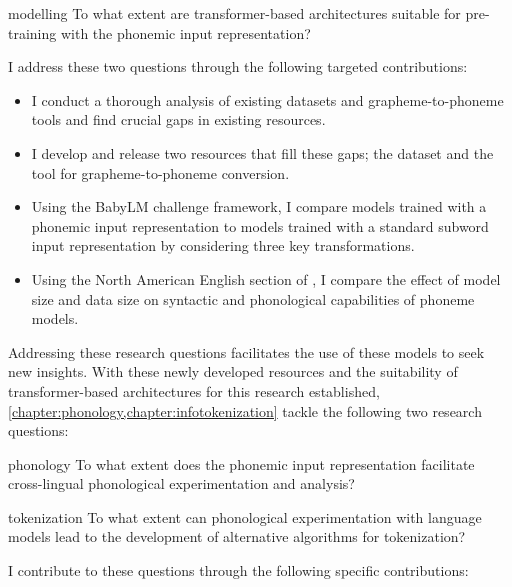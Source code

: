 \begin{question}{}{modelling}
    To what extent are transformer-based architectures suitable for pre-training with the phonemic input representation?
\end{question}

I address these two questions through the following targeted contributions:

\begin{itemize}
    \item I conduct a thorough analysis of existing datasets and grapheme-to-phoneme tools and find crucial gaps in existing resources.
    \item I develop and release two resources that fill these gaps; the \ipachildes dataset and the \gpp tool for grapheme-to-phoneme conversion.
    \item Using the BabyLM challenge framework, I compare models trained with a phonemic input representation to models trained with a standard subword input representation by considering three key transformations.
    \item Using the North American English section of \ipachildes, I compare the effect of model size and data size on syntactic and phonological capabilities of phoneme models. 
\end{itemize}

Addressing these research questions facilitates the use of these models to seek new insights. With these newly developed resources and the suitability of transformer-based architectures for this research established, \cref{chapter:phonology,chapter:infotokenization} tackle the following two research questions:

\begin{question}{}{phonology}
    To what extent does the phonemic input representation facilitate cross-lingual phonological experimentation and analysis?
\end{question}

\begin{question}{}{tokenization}
    To what extent can phonological experimentation with language models lead to the development of alternative algorithms for tokenization? 
\end{question}

I contribute to these questions through the following specific contributions:

